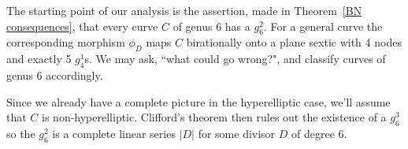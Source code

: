 %
%
%
The starting point of our analysis is the assertion, made in Theorem~\ref{BN consequences}, that every curve $C$ of genus 6 has  a $g^{2}_{6}$. For a general curve the corresponding morphism $\phi_{D}$ maps $C$ birationally onto a plane sextic with 4 nodes and exactly 5 $g^{1}_{4}$s. We may ask, ``what could go wrong?", and classify curves of genus 6 accordingly. 

Since we already have a complete picture in the hyperelliptic case, we'll assume that $C$ is non-hyperelliptic. Clifford's theorem then rules out
the existence of a $g^3_6$ so  the $g^2_6$ is a complete linear series  $|D|$ for some divisor $D$ of degree 6.



